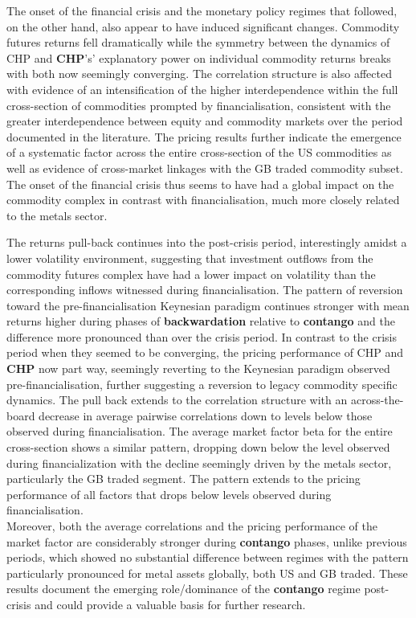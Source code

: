\documentclass[
  authoryear,
  preprint,
  3p]{elsarticle}
\begin{document}
\bigskip

The onset of the financial crisis and the monetary policy regimes that
followed, on the other hand, also appear to have induced significant
changes. Commodity futures returns fell dramatically while the symmetry
between the dynamics of CHP and \textbf{CHP}'s' explanatory power on
individual commodity returns breaks with both now seemingly converging.
The correlation structure is also affected with evidence of an
intensification of the higher interdependence within the full
cross-section of commodities prompted by financialisation, consistent
with the greater interdependence between equity and commodity markets
over the period documented in the literature. The pricing results
further indicate the emergence of a systematic factor across the entire
cross-section of the US commodities as well as evidence of cross-market
linkages with the GB traded commodity subset. The onset of the financial
crisis thus seems to have had a global impact on the commodity complex
in contrast with financialisation, much more closely related to the
metals sector.

\medskip

The returns pull-back continues into the post-crisis period,
interestingly amidst a lower volatility environment, suggesting that
investment outflows from the commodity futures complex have had a lower
impact on volatility than the corresponding inflows witnessed during
financialisation. The pattern of reversion toward the
pre-financialisation Keynesian paradigm continues stronger with mean
returns higher during phases of \textbf{backwardation} relative to
\textbf{contango} and the difference more pronounced than over the
crisis period. In contrast to the crisis period when they seemed to be
converging, the pricing performance of CHP and \textbf{CHP} now part
way, seemingly reverting to the Keynesian paradigm observed
pre-financialisation, further suggesting a reversion to legacy commodity
specific dynamics. The pull back extends to the correlation structure
with an across-the-board decrease in average pairwise correlations down
to levels below those observed during financialisation. The average
market factor beta for the entire cross-section shows a similar pattern,
dropping down below the level observed during financialization with the
decline seemingly driven by the metals sector, particularly the GB
traded segment. The pattern extends to the pricing performance of all
factors that drops below levels observed during financialisation.\\
Moreover, both the average correlations and the pricing performance of
the market factor are considerably stronger during \textbf{contango}
phases, unlike previous periods, which showed no substantial difference
between regimes with the pattern particularly pronounced for metal
assets globally, both US and GB traded. These results document the
emerging role/dominance of the \textbf{contango} regime post-crisis and
could provide a valuable basis for further research.
\end{document}
